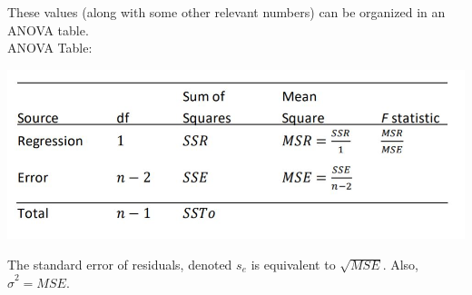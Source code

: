 \documentclass[12pt]{article}
\begin{document}
These values (along with some other relevant numbers) can be organized in an ANOVA table. \\

\noindent ANOVA Table: \\
\vspace{-5mm}
\begin{center}
\includegraphics[scale=0.75]{ANOVAtable.JPG}
\end{center}

The standard error of residuals, denoted $s_{e}$ is equivalent to $\sqrt{MSE}$. Also, $\hat{\sigma}^2 = MSE$. \\
\end{document}
